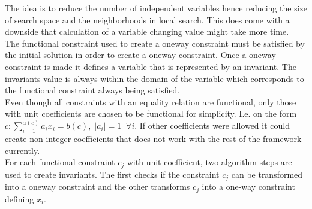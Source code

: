 The idea is to reduce the number of independent variables hence reducing the size of search space and the neighborhoods 
in local search. This does come with a downside that calculation of a variable changing value might take more time. \\ 
The functional constraint used to create a oneway constraint must be satisfied by the initial solution in order to 
create a oneway constraint. Once a oneway constraint is made it defines a variable that is represented by an invariant. 
The invariants value is always within the domain of the variable which corresponds to the functional constraint always 
being satisfied. \\
Even though all  constraints with an equality relation are functional, only those with unit 
coefficients are chosen to be functional for simplicity. I.e. on the form $c: \sum\limits_{i=1}^{\alpha(c)} a_i 
x_i = b(c), \; |a_i|= 1 \; \; \forall i $. If other coefficients were allowed it could create non integer coefficients 
that does not work with the rest of the framework currently. \\ %
For each functional  constraint $c_j$ with unit coefficient, two algorithm steps are used to create 
invariants. The first checks if the constraint $c_j$ can be transformed into a oneway constraint and the other 
transforms $c_j$ into a one-way constraint defining $x_i$. \\ 
\IncMargin{1em}
